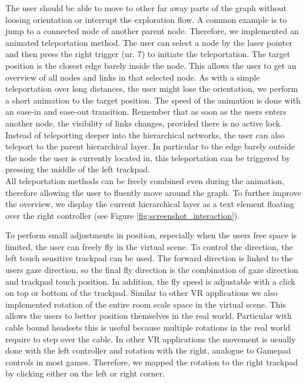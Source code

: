 The user should be able to move to other far away parts of the graph without loosing orientation or interrupt the exploration flow. A common example is to jump to a connected node of another parent node. 
Therefore, we implemented an animated teleportation method. The user can select a node by the laser pointer and then press the right trigger (nr. 7) to initiate the teleportation. The target position is the closest edge barely inside the node. This allows the user to get an overview of all nodes and links in that selected node.   
As with a simple teleportation over long distances, the user might lose the orientation, we perform a short animation to the target position. The speed of the animation is done with an ease-in and ease-out transition.
Remember that as soon as the users enters another node, the visibility of links changes, provided there is no active lock.\\
Instead of teleporting deeper into the hierarchical networks, the user can also teleport to the parent hierarchical layer. In particular to the edge barely outside the node the user is currently located in, this teleportation can be triggered by pressing the middle of the left trackpad.\\
All teleportation methods can be freely combined even during the animation, therefore allowing the user to fluently move around the graph. 
To further improve the overview, we display the current hierarchical layer as a text element floating over the right controller (see Figure \ref{fig:screenshot_interaction}). 

To perform small adjustments in position, especially when the users free space is limited, the user can freely fly in the virtual scene. To control the direction, the left touch sensitive trackpad can be used. 
The forward direction is linked to the users gaze direction, so the final fly direction is the combination of gaze direction and trackpad touch position. 
In addition, the fly speed is adjustable with a click on top or bottom of the trackpad.    
Similar to other VR applications we also implemented rotation of the entire room scale space in the virtual scene. This allows the users to better position themselves in the real world. 
Particular with cable bound headsets this is useful because multiple rotations in the real world require to step over the cable. In other VR applications the movement is usually done with the left controller and rotation with the right, analogue to Gamepad controls in most games. Therefore, we mapped the rotation to the right trackpad by clicking either on the left or right corner.

